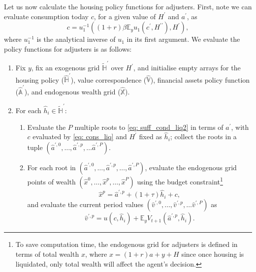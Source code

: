 \documentclass[12pt]{article}
\begin{document}
Let us now calculate the housing policy functions for adjusters. First, note we can evaluate consumption today $c$, for a given value of $H^{\prime}$ and $a^{\prime}$, as
%
\begin{equation}\label{eq: cons_liq}
c = u_{1}^{-1}((1+r)\beta \mathbb{E}_{y}u_{1}(c^{\prime}, H^{\prime\prime}), H^{\prime}),
\end{equation}
%
where $ u_{1}^{-1}$ is the analytical inverse of $u_{1}$ in its first argument. We evaluate the policy functions for adjusters is as follows:
%
%
\begin{tcolorbox}[
colframe=black!100,
colback=white!10,
coltitle=white!100!black,  
fonttitle=\bfseries,
adjusted title= Box 2: FUES and EGM for adjuster policy function]
\begin{enumerate}
    \item Fix $y$, fix an exogenous grid $\mathbb{\tilde{H}}^{\prime}$ over $H^{\prime}$, and initialise empty arrays for the housing policy ($\mathbb{\hat{H}}^{\prime}$), value correspondence ($\mathbb{\hat{V}}$), financial assets policy function ($\mathbb{\hat{A}}^{\prime}$), and endogenous wealth grid ($\mathbb{\hat{X}}$). 
    \item For each $\hat{h}_{i}\in \mathbb{\tilde{H}}^{\prime}$:
    \begin{enumerate}[label=(\roman*)]
    \item Evaluate the $P$ multiple roots to \eqref{eq: suff_cond_liq2} in terms of $a^{\prime}$, with $c$ evaluated by \eqref{eq: cons_liq} and $H^{\prime}$ fixed as $\hat{h}_{i}$; collect the roots in a tuple $(\hat{a}^{\prime,0}, \dots, \hat{a}^{\prime,p},  \dots \hat{a}^{\prime,P})$. 
    \item For each root in $(\hat{a}^{\prime,0}, \dots, \hat{a}^{\prime,p}, \dots,  \hat{a}^{\prime,P})$, evaluate the endogenous grid points of wealth $(\hat{x}^{0}, \dots, \hat{x}^{p}, \dots, \hat{x}^{P})$ using the budget constraint\footnote{To save computation time, the endogenous grid for adjusters is defined in terms of total wealth $x$, where $x = (1+r)a + y + H$ since once housing is liquidated, only total wealth will affect the agent's decision.}
    \begin{equation*}
    \hat{x}^{p} = \hat{a}^{\prime, p} + (1+\tau) \hat{h}_{i} + c,
    \end{equation*}
    and evaluate the current period values $(\hat{v}^{\prime,0}, \dots, \hat{v}^{\prime,p}, \dots  \hat{v}^{\prime,P})$ as
    \begin{equation*}
    \hat{v}^{\prime,p} = u(c, \hat{h}_{i}) + \mathbb{E}_{y}V_{t+1}(\hat{a}^{\prime,p}, \hat{h}_{i}).

\end{equation*}
\end{enumerate}
\end{enumerate}
\end{tcolorbox}
\end{document}
